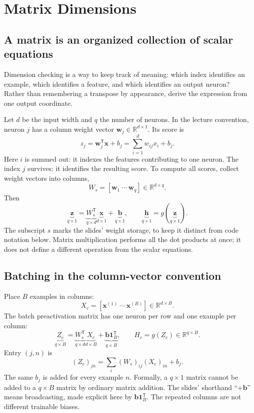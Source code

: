 \section{Matrix Dimensions}
\label{sec:logreg_to_mlp:matrix_dimensions}

\subsection{A matrix is an organized collection of scalar equations}
Dimension checking is a way to keep track of meaning: which index identifies an example, which identifies a feature, and which identifies an output neuron? Rather than remembering a transpose by appearance, derive the expression from one output coordinate.

Let $d$ be the input width and $q$ the number of neurons. In the lecture convention, neuron $j$ has a column weight vector $\mathbf{w}_j\in\mathbb{R}^{d\times1}$. Its score is
\[
 z_j=\mathbf{w}_j^{\mathsf T}\mathbf{x}+b_j
     =\sum_{i=1}^d w_{ij}x_i+b_j.
\]
Here $i$ is summed out: it indexes the features contributing to one neuron. The index $j$ survives: it identifies the resulting score. To compute all scores, collect weight vectors into columns,
\[
 W_s=[\mathbf{w}_1\ \cdots\ \mathbf{w}_q]\in\mathbb{R}^{d\times q}.
\]
Then
\[
 \underbrace{\mathbf{z}}_{q\times1}
 =\underbrace{W_s^{\mathsf T}}_{q\times d}
  \underbrace{\mathbf{x}}_{d\times1}
  +\underbrace{\mathbf{b}}_{q\times1},\qquad
 \underbrace{\mathbf{h}}_{q\times1}=g(\underbrace{\mathbf{z}}_{q\times1}).
\]
The subscript $s$ marks the slides' weight storage, to keep it distinct from code notation below. Matrix multiplication performs all the dot products at once; it does not define a different operation from the scalar equations.

\subsection{Batching in the column-vector convention}
Place $B$ examples in columns:
\[
 X_c=[\mathbf{x}^{(1)}\ \cdots\ \mathbf{x}^{(B)}]
 \in\mathbb{R}^{d\times B}.
\]
The batch preactivation matrix has one neuron per row and one example per column:
\begin{equation}
 \underbrace{Z_c}_{q\times B}
 =\underbrace{W_s^{\mathsf T}}_{q\times d}
  \underbrace{X_c}_{d\times B}
  +\underbrace{\mathbf{b}\mathbf{1}_B^{\mathsf T}}_{q\times B},
 \qquad H_c=g(Z_c)\in\mathbb{R}^{q\times B}.
\end{equation}
Entry $(j,n)$ is
\[
 (Z_c)_{jn}=\sum_i(W_s)_{ij}(X_c)_{in}+b_j.
\]
The same $b_j$ is added for every example $n$. Formally, a $q\times1$ matrix cannot be added to a $q\times B$ matrix by ordinary matrix addition. The slides' shorthand ``$+\mathbf{b}$'' means broadcasting, made explicit here by $\mathbf{b}\mathbf{1}_B^{\mathsf T}$. The repeated columns are not different trainable biases.

